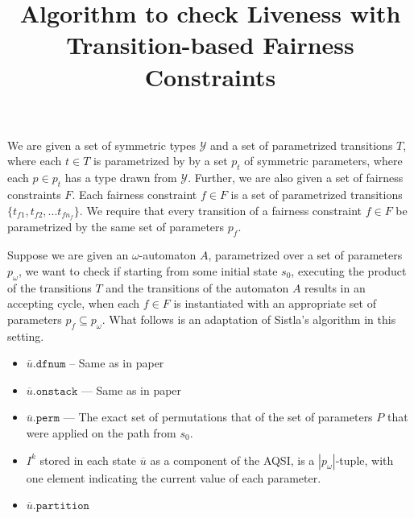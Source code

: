 \documentclass{article}[10pt]
\title{Algorithm to check Liveness with\\Transition-based Fairness Constraints}
\begin{document}
\begin{spacing}{1}
\maketitle

We are given a set of symmetric types $\mathcal{Y}$ and a set of
parametrized transitions $T$, where each $t \in
T$ is parametrized by by a set $p_t$ of symmetric
parameters, where each $p \in p_t$ has a type drawn from
$\mathcal{Y}$. Further, we are also given a set of fairness
constraints $F$. Each fairness constraint $f \in F$ is a set of
parametrized transitions $\{t_{f1}, t_{f2}, ... t_{fn_f}\}$. 
We require that every transition of a fairness constraint
$f \in F$ be parametrized by the same set of parameters $p_f$.

Suppose we are given an $\omega$-automaton $A$, parametrized over a
set of parameters $p_{\omega}$, we want to check if
starting from some initial state $s_0$, executing the product of the
transitions $T$ and the transitions of the automaton $A$ results in an
accepting cycle, when each $f \in F$ is instantiated with an
appropriate set of parameters $p_f \subseteq p_{\omega}$.
What follows is an adaptation of Sistla's algorithm
in this setting.

\begin{itemize}
\item
$\overline{u}.\mathtt{dfnum}$ -- Same as in paper
\item
$\overline{u}.\mathtt{onstack}$ --- Same as in paper
\item
$\overline{u}.\mathtt{perm}$ --- The exact set of permutations that
of the set of parameters $P$ that were applied on the path from $s_0$.
\item
$I^k$ stored in each state $\overline{u}$ as a component of the AQSI,
is a $|p_{\omega}|$-tuple, with one element indicating the current
value of each parameter.
\item

$\overline{u}.\mathtt{partition}$

\end{itemize}

\end{spacing}
\end{document}
